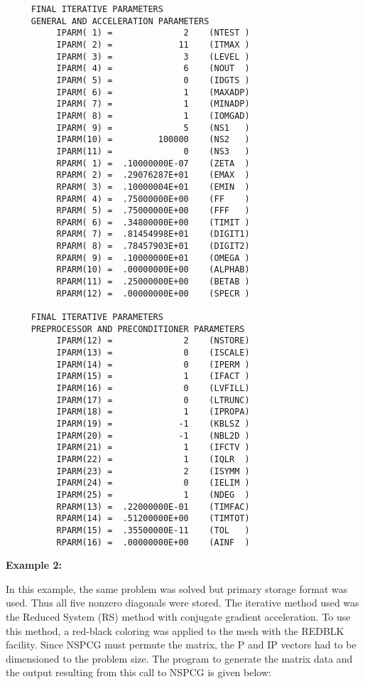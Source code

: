 \begin{verbatim}
     FINAL ITERATIVE PARAMETERS
     GENERAL AND ACCELERATION PARAMETERS
          IPARM( 1) =              2    (NTEST )
          IPARM( 2) =             11    (ITMAX )
          IPARM( 3) =              3    (LEVEL )
          IPARM( 4) =              6    (NOUT  )
          IPARM( 5) =              0    (IDGTS )
          IPARM( 6) =              1    (MAXADP)
          IPARM( 7) =              1    (MINADP)
          IPARM( 8) =              1    (IOMGAD)
          IPARM( 9) =              5    (NS1   )
          IPARM(10) =         100000    (NS2   )
          IPARM(11) =              0    (NS3   )
          RPARM( 1) =  .10000000E-07    (ZETA  )
          RPARM( 2) =  .29076287E+01    (EMAX  )
          RPARM( 3) =  .10000004E+01    (EMIN  )
          RPARM( 4) =  .75000000E+00    (FF    )
          RPARM( 5) =  .75000000E+00    (FFF   )
          RPARM( 6) =  .34800000E+00    (TIMIT )
          RPARM( 7) =  .81454998E+01    (DIGIT1)
          RPARM( 8) =  .78457903E+01    (DIGIT2)
          RPARM( 9) =  .10000000E+01    (OMEGA )
          RPARM(10) =  .00000000E+00    (ALPHAB)
          RPARM(11) =  .25000000E+00    (BETAB )
          RPARM(12) =  .00000000E+00    (SPECR )
 
     FINAL ITERATIVE PARAMETERS
     PREPROCESSOR AND PRECONDITIONER PARAMETERS
          IPARM(12) =              2    (NSTORE)
          IPARM(13) =              0    (ISCALE)
          IPARM(14) =              0    (IPERM )
          IPARM(15) =              1    (IFACT )
          IPARM(16) =              0    (LVFILL)
          IPARM(17) =              0    (LTRUNC)
          IPARM(18) =              1    (IPROPA)
          IPARM(19) =             -1    (KBLSZ )
          IPARM(20) =             -1    (NBL2D )
          IPARM(21) =              1    (IFCTV )
          IPARM(22) =              1    (IQLR  )
          IPARM(23) =              2    (ISYMM )
          IPARM(24) =              0    (IELIM )
          IPARM(25) =              1    (NDEG  )
          RPARM(13) =  .22000000E-01    (TIMFAC)
          RPARM(14) =  .51200000E+00    (TIMTOT)
          RPARM(15) =  .35500000E-11    (TOL   )
          RPARM(16) =  .00000000E+00    (AINF  )
\end{verbatim}
\newpage 
\noindent
{\bf Example 2:}
\bigskip
\indent

In this example, the same problem was solved but primary storage
format was used.  Thus all five nonzero diagonals were stored.
The iterative method used was the Reduced System (RS) method with 
conjugate gradient acceleration.  To use this method, a red-black
coloring was applied to the mesh with the REDBLK facility.  Since
NSPCG must permute the matrix, the P and IP vectors had to be
dimensioned to the problem size.  The program to generate the matrix 
data and the output resulting from this call to NSPCG is given below:

